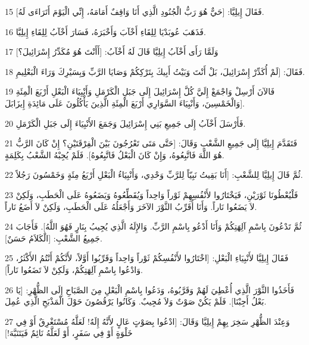 \par 15 فَقَالَ إِيلِيَّا: [حَيٌّ هُوَ رَبُّ الْجُنُودِ الَّذِي أَنَا وَاقِفٌ أَمَامَهُ، إِنِّي الْيَوْمَ أَتَرَاءَى لَهُ].
\par 16 فَذَهَبَ عُوبَدْيَا لِلِقَاءِ أَخْآبَ وَأَخْبَرَهُ، فَسَارَ أَخْآبُ لِلِقَاءِ إِيلِيَّا.
\par 17 وَلَمَّا رَأَى أَخْآبُ إِيلِيَّا قَالَ لَهُ أَخْآبُ: [أَأَنْتَ هُوَ مُكَدِّرُ إِسْرَائِيلَ؟]
\par 18 فَقَالَ: [لَمْ أُكَدِّرْ إِسْرَائِيلَ، بَلْ أَنْتَ وَبَيْتُ أَبِيكَ بِتَرْكِكُمْ وَصَايَا الرَّبِّ وَبِسَيْرِكَ وَرَاءَ الْبَعْلِيمِ.
\par 19 فَالآنَ أَرْسِلْ وَاجْمَعْ إِلَيَّ كُلَّ إِسْرَائِيلَ إِلَى جَبَلِ الْكَرْمَلِ وَأَنْبِيَاءَ الْبَعْلِ أَرْبَعَ الْمِئَةِ وَالْخَمْسِينَ، وَأَنْبِيَاءَ السَّوَارِي أَرْبَعَ الْمِئَةِ الَّذِينَ يَأْكُلُونَ عَلَى مَائِدَةِ إِيزَابَلَ].
\par 20 فَأَرْسَلَ أَخْآبُ إِلَى جَمِيعِ بَنِي إِسْرَائِيلَ وَجَمَعَ الأَنْبِيَاءَ إِلَى جَبَلِ الْكَرْمَلِ.
\par 21 فَتَقَدَّمَ إِيلِيَّا إِلَى جَمِيعِ الشَّعْبِ وَقَالَ: [حَتَّى مَتَى تَعْرُجُونَ بَيْنَ الْفِرْقَتَيْنِ؟ إِنْ كَانَ الرَّبُّ هُوَ اللَّهَ فَاتَّبِعُوهُ، وَإِنْ كَانَ الْبَعْلُ فَاتَّبِعُوهُ]. فَلَمْ يُجِبْهُ الشَّعْبُ بِكَلِمَةٍ.
\par 22 ثُمَّ قَالَ إِيلِيَّا لِلشَّعْبِ: [أَنَا بَقِيتُ نَبِيّاً لِلرَّبِّ وَحْدِي، وَأَنْبِيَاءُ الْبَعْلِ أَرْبَعُ مِئَةٍ وَخَمْسُونَ رَجُلاً.
\par 23 فَلْيُعْطُونَا ثَوْرَيْنِ، فَيَخْتَارُوا لأَنْفُسِهِمْ ثَوْراً وَاحِداً وَيُقَطِّعُوهُ وَيَضَعُوهُ عَلَى الْحَطَبِ، وَلَكِنْ لاَ يَضَعُوا نَاراً. وَأَنَا أُقَرِّبُ الثَّوْرَ الآخَرَ وَأَجْعَلُهُ عَلَى الْحَطَبِ، وَلَكِنْ لاَ أَضَعُ نَاراً.
\par 24 ثُمَّ تَدْعُونَ بِاسْمِ آلِهَتِكُمْ وَأَنَا أَدْعُو بِاسْمِ الرَّبِّ. وَالإِلَهُ الَّذِي يُجِيبُ بِنَارٍ فَهُوَ اللَّهُ]. فَأَجَابَ جَمِيعُ الشَّعْبِ: [الْكَلاَمُ حَسَنٌ].
\par 25 فَقَالَ إِيلِيَّا لأَنْبِيَاءِ الْبَعْلِ: [اخْتَارُوا لأَنْفُسِكُمْ ثَوْراً وَاحِداً وَقَرِّبُوا أَوَّلاً، لأَنَّكُمْ أَنْتُمُ الأَكْثَرُ، وَادْعُوا بِاسْمِ آلِهَتِكُمْ، وَلَكِنْ لاَ تَضَعُوا نَاراً].
\par 26 فَأَخَذُوا الثَّوْرَ الَّذِي أُعْطِيَ لَهُمْ وَقَرَّبُوهُ، وَدَعُوا بِاسْمِ الْبَعْلِ مِنَ الصَّبَاحِ إِلَى الظُّهْرِ: [يَا بَعْلُ أَجِبْنَا]. فَلَمْ يَكُنْ صَوْتٌ وَلاَ مُجِيبٌ. وَكَانُوا يَرْقُصُونَ حَوْلَ الْمَذْبَحِ الَّذِي عُمِلَ.
\par 27 وَعِنْدَ الظُّهْرِ سَخِرَ بِهِمْ إِيلِيَّا وَقَالَ: [ادْعُوا بِصَوْتٍ عَالٍ لأَنَّهُ إِلَهٌ! لَعَلَّهُ مُسْتَغْرِقٌ أَوْ فِي خَلْوَةٍ أَوْ فِي سَفَرٍ، أَوْ لَعَلَّهُ نَائِمٌ فَيَتَنَبَّهَ!]

